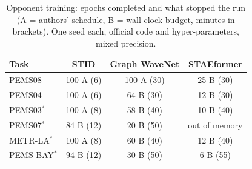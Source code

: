 \begin{table}[t]
\caption{Opponent training: epochs completed and what stopped the run (A = authors' schedule, B = wall-clock budget, minutes in brackets). One seed each, official code and hyper-parameters, mixed precision.}
\label{tab:budget}
\scriptsize
\setlength{\tabcolsep}{3pt}
\begin{tabular}{@{}lccc@{}}
\toprule
Task & STID & Graph WaveNet & STAEformer \\
\midrule
PEMS08 & 100 A (6) & 100 A (30) & 25 B (30) \\
PEMS04 & 100 A (6) & 64 B (30) & 12 B (30) \\
PEMS03$^\ast$ & 100 A (8) & 58 B (40) & 10 B (40) \\
PEMS07$^\ast$ & 84 B (12) & 20 B (50) & out of memory \\
METR-LA$^\ast$ & 100 A (8) & 60 B (40) & 12 B (40) \\
PEMS-BAY$^\ast$ & 94 B (12) & 30 B (50) & 6 B (55) \\
\bottomrule
\end{tabular}
\end{table}